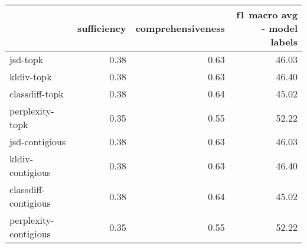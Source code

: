 \begin{tabular}{lrrr}
\toprule
{} &  sufficiency &  comprehensiveness &  f1 macro avg - model labels \\
\midrule
jsd-topk              &         0.38 &               0.63 &                        46.03 \\
kldiv-topk            &         0.38 &               0.63 &                        46.40 \\
classdiff-topk        &         0.38 &               0.64 &                        45.02 \\
perplexity-topk       &         0.35 &               0.55 &                        52.22 \\
jsd-contigious        &         0.38 &               0.63 &                        46.03 \\
kldiv-contigious      &         0.38 &               0.63 &                        46.40 \\
classdiff-contigious  &         0.38 &               0.64 &                        45.02 \\
perplexity-contigious &         0.35 &               0.55 &                        52.22 \\
\bottomrule
\end{tabular}
